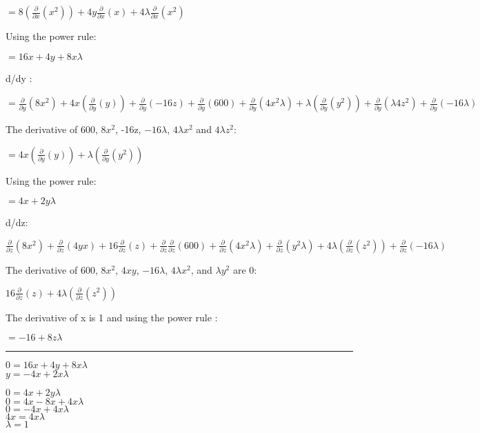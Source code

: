 \documentclass[]{article}
\begin{document}
\(= 8 (\frac{\partial}{\partial x}(x^2)) + 4y\frac{\partial}{\partial x}(x) + 4 \lambda \frac{\partial}{\partial x}(x^2)\)

Using the power rule:

\(= 16x + 4y + 8x\lambda\)

d/dy :

\(= \frac{\partial}{\partial y}(8x^2) + 4x(\frac{\partial}{\partial y}(y)) + \frac{\partial}{\partial y}(-16z) + \frac{\partial}{\partial y}(600) + \frac{\partial}{\partial y}(4x^2\lambda) + \lambda ( \frac{\partial}{\partial y} (y^2)) + \frac{\partial}{\partial y}(\lambda4z^2) + \frac{\partial}{\partial y}(-16\lambda)\)

The derivative of 600, \(8x^2\), -16z, \(-16\lambda\), \(4\lambda x^2\)
and \(4 \lambda z^2\):

\(= 4x(\frac{\partial}{\partial y}(y)) + \lambda ( \frac{\partial}{\partial y} (y^2))\)

Using the power rule:

\(= 4x + 2y \lambda\)

d/dz:

\(\frac{\partial}{\partial z} (8x^2) + \frac{\partial}{\partial z}(4yx) + 16\frac{\partial}{\partial z}(z) + \frac{\partial}{\partial z} \frac{\partial}{\partial z} (600) + \frac{\partial}{\partial z} (4x^2 \lambda) + \frac{\partial}{\partial z} (y^2 \lambda) + 4 \lambda (\frac{\partial}{\partial z} (z^2)) + \frac{\partial}{\partial z} (-16 \lambda)\)

The derivative of \(600\), \(8x^2\), \(4xy\), \(-16 \lambda\),
\(4 \lambda x^2\), and \(\lambda y^2\) are 0:

\(16\frac{\partial}{\partial z}(z) + 4 \lambda (\frac{\partial}{\partial z} (z^2))\)

The derivative of x is 1 and using the power rule :

\(= -16 + 8z \lambda\)

\begin{center}\rule{0.5\linewidth}{\linethickness}\end{center}

\(0 = 16x + 4y + 8x\lambda\)\\
\(y = -4x + 2x \lambda\)

\(0 = 4x + 2y \lambda\)\\
\(0 = 4x -8x +4x \lambda\)\\
\(0 = -4x +4x \lambda\)\\
\(4x = 4x \lambda\)\\
\(\lambda = 1\)
\end{document}
